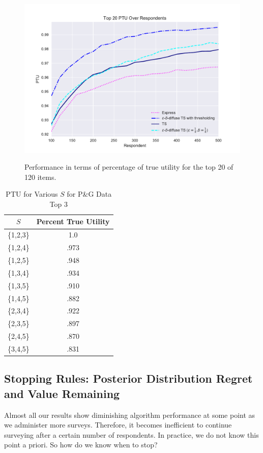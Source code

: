 \documentclass[nonblindrev]{informs3}
\begin{document}
\begin{figure}
\caption{Performance in terms of percentage of true utility for the top 20 of 120 items.}
\includegraphics[width=1\textwidth]{plots/PTU120v20k20.pdf}
\label{fig:20util}
\end{figure}
\begin{table}
\caption{PTU for Various $S$ for P\&G Data Top 3}
\begin{center}
\begin{tabular}{c | c }
$S$& Percent True Utility \\
\hline
\{1,2,3\}& 1.0 \\
\{1,2,4\}&.973 \\
\{1,2,5\}&.948 \\
\{1,3,4\}&.934 \\
\{1,3,5\}&.910 \\
\{1,4,5\}&.882 \\
\{2,3,4\}&.922 \\
\{2,3,5\}&.897 \\
\{2,4,5\}&.870 \\
\{3,4,5\}&.831 \\
\hline
\end{tabular}
\end{center}
\label{table:PTU}
\end{table}

\subsection{Stopping Rules: Posterior Distribution Regret and Value Remaining}

Almost all our results show diminishing algorithm performance at some point as we administer more surveys. Therefore, it becomes inefficient to continue surveying after a certain number of respondents. In practice, we do not know this point a priori. So how do we know when to stop?
\end{document}
